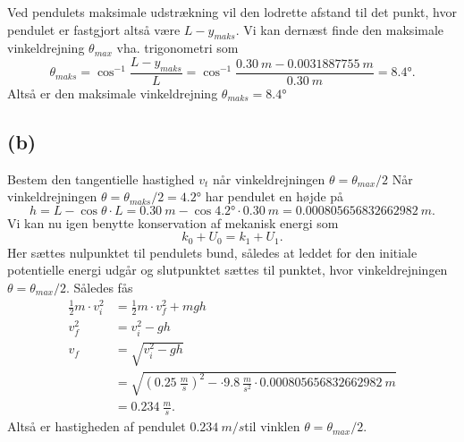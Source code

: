 \documentclass[12pt]{article}
\theoremstyle{definition}
\begin{document}
Ved pendulets maksimale udstrækning vil den lodrette afstand til det punkt, hvor pendulet er fastgjort altså være $L - y_{maks}$. Vi kan dernæst finde den maksimale vinkeldrejning $\theta_{max}$ vha. trigonometri som
\[ 
\theta_{maks} = \cos^{-1} \frac{L- y_{maks}}{L} = \cos^{-1} \frac{\qty{0,30}{m} - \qty{0,0031887755}{m}}{\qty{0,30}{m}} = \ang{8,4} 
.\]
Altså er den maksimale vinkeldrejning \underline{\underline{$\theta_{maks} = \ang{8,4} $}}




\subsection*{(b)}
Bestem den tangentielle hastighed $v_t$ når vinkeldrejningen $\theta = \theta_{max} / 2$
\bigbreak
Når vinkeldrejningen $\theta = \theta_{maks} / 2 = \ang{4,2}$ har pendulet en højde på
\[ 
h = L - \cos \theta \cdot L = \qty{0,30}{m}  - \cos \ang{4,2} \cdot \qty{0,30}{m} = \qty{0,000805656832662982}{m} 
.\]
Vi kan nu igen benytte konservation af mekanisk energi som
\[ 
k_0 + U_0 = k_1 + U_1
.\]
Her sættes nulpunktet til pendulets bund, således at leddet for den initiale potentielle energi udgår og slutpunktet sættes til punktet, hvor vinkeldrejningen $\theta = \theta_{max} / 2$. Således fås
\begin{align*}
  \frac{1}{2}m \cdot v_i^2 &= \frac{1}{2}m \cdot v_f^2 + mgh \\
  v_f^2 &= v_i^2 - gh \\
  v_f &= \sqrt{v_i^2 - gh} \\
  &= \sqrt{\left(\qty{0,25}{\frac{m}{s}}\right)^2 - \cdot \qty{9,8}{\frac{m}{s^2}} \cdot \qty{0.000805656832662982}{m}} \\
  &= \qty{0,234}{\frac{m}{s}}  
.\end{align*}
Altså er hastigheden af pendulet \underline{\underline{$\qty{0,234}{m \per s}$}}til vinklen $\theta = \theta_{max} / 2$.
\end{document}
